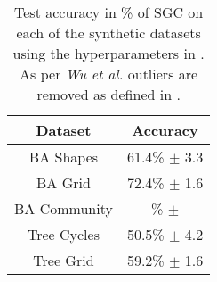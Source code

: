 \begin{table}
    \centering
    \begin{tabular}{c|c}
        \textbf{Dataset} & \textbf{Accuracy} \\
        \midrule
        BA Shapes       & 61.4\% $\pm$ 3.3 \\
        BA Grid         & 72.4\% $\pm$ 1.6 \\
        BA Community    & \% $\pm$ \\
        Tree Cycles     & 50.5\% $\pm$ 4.2 \\
        Tree Grid       & 59.2\% $\pm$ 1.6 \\
    \end{tabular}
    \caption{Test accuracy in \% of SGC on each of the synthetic datasets using the hyperparameters in . As per \textit{Wu et al.}\cite{wu2019simplifying} outliers are removed as defined in .}
    \label{tab:GCN-acc}
\end{table}

